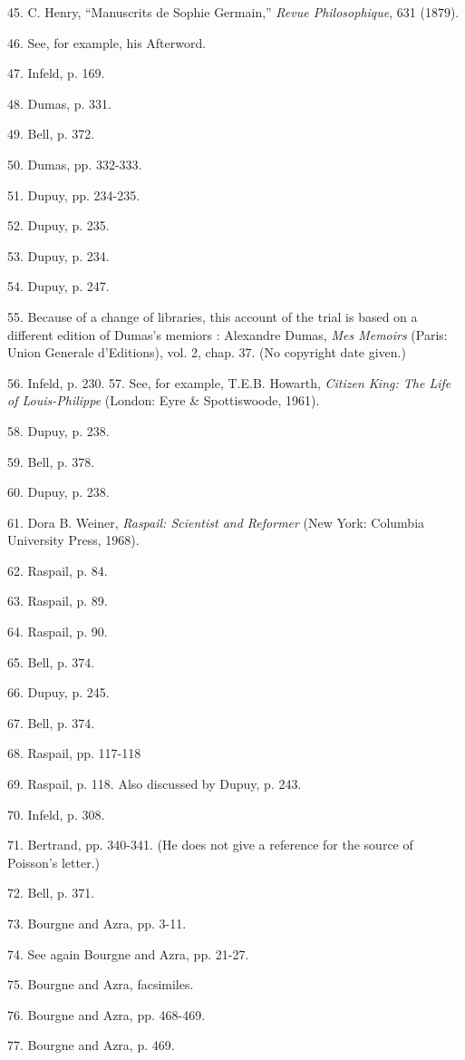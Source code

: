 \documentclass[12pt]{article}
\begin{document}
45. C. Henry, ``Manuscrits de Sophie Germain,'' \emph{Revue Philosophique}, 631 (1879). 

46. See, for example, his Afterword. 

47. Infeld, p. 169. 

48. Dumas, p. 331. 

49. Bell, p. 372. 

50. Dumas, pp. 332-333. 

51. Dupuy, pp. 234-235. 

52. Dupuy, p. 235. 

53. Dupuy, p. 234. 

54. Dupuy, p. 247. 

55. Because of a change of libraries, this account of the trial is based on a different edition of Dumas's memiors
: Alexandre Dumas, {\it Mes Memoirs} (Paris: Union Generale d'Editions), vol. 2, chap. 37. (No copyright date given.) 

56. Infeld, p. 230. 57. See, for example, T.E.B. Howarth, \emph{Citizen King: The Life of Louis-Philippe} (London: Eyre \&
Spottiswoode, 1961). 

58. Dupuy, p. 238. 

59. Bell, p. 378. 

60. Dupuy, p. 238. 

61. Dora B. Weiner, \emph{Raspail: Scientist and Reformer} (New York: Columbia University Press, 1968). 

62. Raspail, p. 84. 

63. Raspail, p. 89. 

64. Raspail, p. 90. 

65. Bell, p. 374. 

66. Dupuy, p. 245. 

67. Bell, p. 374. 

68. Raspail, pp. 117-118 

69. Raspail, p. 118. Also discussed by Dupuy, p. 243. 

70. Infeld, p. 308. 

71. Bertrand, pp. 340-341. (He does not give a reference for the source of Poisson's letter.) 

72. Bell, p. 371. 

73. Bourgne and Azra, pp. 3-11. 

74. See again Bourgne and Azra, pp. 21-27. 

75. Bourgne and Azra, facsimiles. 

76. Bourgne and Azra, pp. 468-469. 

77. Bourgne and Azra, p. 469. 
\end{document}
